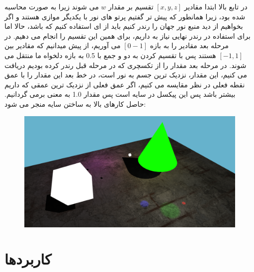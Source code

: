 \documentclass[a4paper, 12pt]{book}
\begin{document}
     در تابع بالا ابتدا مقادیر
     $[x, y, z]$
     تقسیم بر مقدار
     $w$
     می شوند زیرا  به صورت  محاسبه شده بود، زیرا همانطور که پیش تر گفتیم پرتو های نور با یکدیگر موازی هستند و اگر بخواهیم از دید منبع نور جهان را رندر کنیم باید از  ای استفاده کنیم که  باشد، حالا اما برای استفاده در رندر نهایی نیاز به  داریم، برای همین این تقسیم را انجام می دهیم. در مرحله بعد مقادیر را به بازه
     $[0-1]$
     می آوریم، از پیش میدانیم که مقادیر بین
     $[-1, 1]$
     هستند پس با تقسیم کردن به دو و جمع با 0.5 به بازه دلخواه ما منتقل می شوند. در مرحله بعد مقدار  را از تکسچری که در مرحله قبل رندر کرده بودیم دریافت می کنیم، این مقدار، نزدیک ترین جسم به نور است، در خط بعد این مقدار را با عمق نقطه فعلی در نظر مقایسه می کنیم، اگر عمق فعلی از نزدیک ترین عمقی که داریم بیشتر باشد پس این پیکسل در سایه است پس مقدار 1.0 به معنی  برمی گردانیم. حاصل کارهای بالا به ساختن سایه منجر می شود:

\begin{figure}[H]
    \centering
    \href{https://github.com/devprofile98/shm}{
        \includegraphics[width=13cm]{images/sceme-shadow.png}
    }
    \caption{}
    \label{fig:my_label}
\end{figure}

\newpage
{}
\section*{\huge{کاربردها}}
\vspace*{0.6cm}
\noindent
\normalsize
\end{document}
